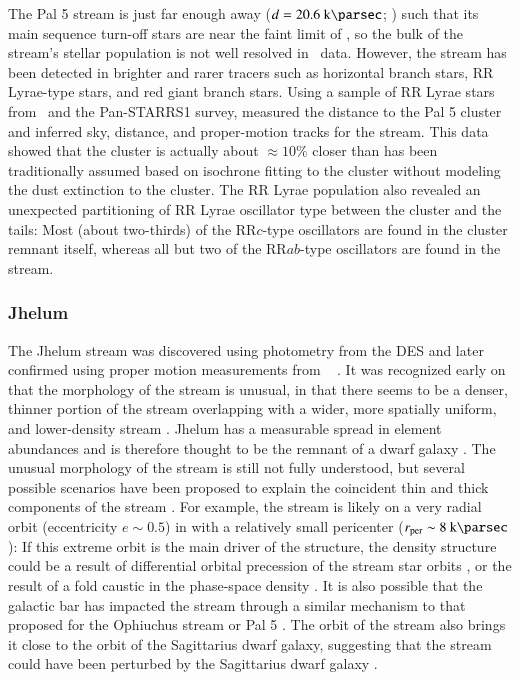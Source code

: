 \documentclass[final,5p,times,twocolumn,authoryear]{elsarticle}
\begin{document}
The Pal 5 stream is just far enough away ($d = 20.6~\kpc$; \citealt{price-whelan:2019})
such that its main sequence turn-off stars are near the faint limit of \gaia, so the
bulk of the stream's stellar population is not well resolved in \gaia\ data.
However, the stream has been detected in brighter and rarer tracers such as horizontal
branch stars, RR Lyrae-type stars, and red giant branch stars.
Using a sample of RR Lyrae stars from \gaia\ and the Pan-STARRS1 survey,
\citet{price-whelan:2019} measured the distance to the Pal 5 cluster and inferred sky,
distance, and proper-motion tracks for the stream.
This data showed that the cluster is actually about $\approx 10\%$ closer than has been
traditionally assumed based on isochrone fitting to the cluster without modeling the
dust extinction to the cluster.
The RR Lyrae population also revealed an unexpected partitioning of RR Lyrae oscillator
type between the cluster and the tails:
Most (about two-thirds) of the RR$c$-type oscillators are found in the cluster remnant
itself, whereas all but two of the RR$ab$-type oscillators are found in the stream.


\subsubsection{Jhelum}
\label{sec:jhelum}

The Jhelum stream \citep{shipp:2018} was discovered using photometry from the DES and
later confirmed using proper motion measurements from \gaia\  \citep{shipp:2019}.
It was recognized early on that the morphology of the stream is unusual, in that there
seems to be a denser, thinner portion of the stream overlapping with a wider, more
spatially uniform, and lower-density stream \citep{bonaca:2019}.
Jhelum has a measurable spread in element abundances \citep{ji:2020, li:2022} and is
therefore thought to be the remnant of a dwarf galaxy \citep{sheffield:2021}.
The unusual morphology of the stream is still not fully understood, but several possible
scenarios have been proposed to explain the coincident thin and thick components of the
stream \citep[see, e.g., the discussion Section~5 of ][]{bonaca:2019}.
For example, the stream is likely on a very radial orbit (eccentricity $e \sim 0.5$) in
with a relatively small pericenter ($\rper \sim 8~\kpc$): If this extreme orbit is the
main driver of the structure, the density structure could be a result of differential
orbital precession of the stream star orbits \citep{erkal:2016b}, or the result of a
fold caustic in the phase-space density \citep{tremaine:1999}.
It is also possible that the galactic bar has impacted the stream through a similar
mechanism to that proposed for the Ophiuchus stream \citep{price-whelan:2016b} or Pal 5
\citep{pearson:2017}.
The orbit of the stream also brings it close to the orbit of the Sagittarius dwarf
galaxy, suggesting that the stream could have been perturbed by the Sagittarius dwarf
galaxy \citep{woudenberg:2023}.
\end{document}
